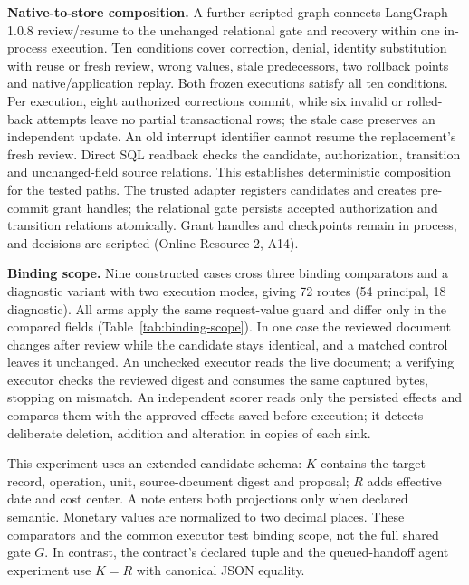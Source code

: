 \documentclass[pdflatex,sn-basic]{sn-jnl}
\begin{document}
\textbf{Native-to-store composition.} A further scripted graph connects LangGraph 1.0.8 review/resume to the unchanged relational gate and recovery within one in-process execution. Ten conditions cover correction, denial, identity substitution with reuse or fresh review, wrong values, stale predecessors, two rollback points and native/application replay. Both frozen executions satisfy all ten conditions. Per execution, eight authorized corrections commit, while six invalid or rolled-back attempts leave no partial transactional rows; the stale case preserves an independent update. An old interrupt identifier cannot resume the replacement's fresh review. Direct SQL readback checks the candidate, authorization, transition and unchanged-field source relations. This establishes deterministic composition for the tested paths. The trusted adapter registers candidates and creates pre-commit grant handles; the relational gate persists accepted authorization and transition relations atomically. Grant handles and checkpoints remain in process, and decisions are scripted (Online Resource 2, A14).

\textbf{Binding scope.} Nine constructed cases cross three binding comparators and a diagnostic variant with two execution modes, giving 72 routes (54 principal, 18 diagnostic). All arms apply the same request-value guard and differ only in the compared fields (Table~\ref{tab:binding-scope}). In one case the reviewed document changes after review while the candidate stays identical, and a matched control leaves it unchanged. An unchecked executor reads the live document; a verifying executor checks the reviewed digest and consumes the same captured bytes, stopping on mismatch. An independent scorer reads only the persisted effects and compares them with the approved effects saved before execution; it detects deliberate deletion, addition and alteration in copies of each sink.

This experiment uses an extended candidate schema: $K$ contains the target record, operation, unit, source-document digest and proposal; $R$ adds effective date and cost center. A note enters both projections only when declared semantic. Monetary values are normalized to two decimal places. These comparators and the common executor test binding scope, not the full shared gate $G$. In contrast, the contract's declared tuple and the queued-handoff agent experiment use $K=R$ with canonical JSON equality.
\end{document}
